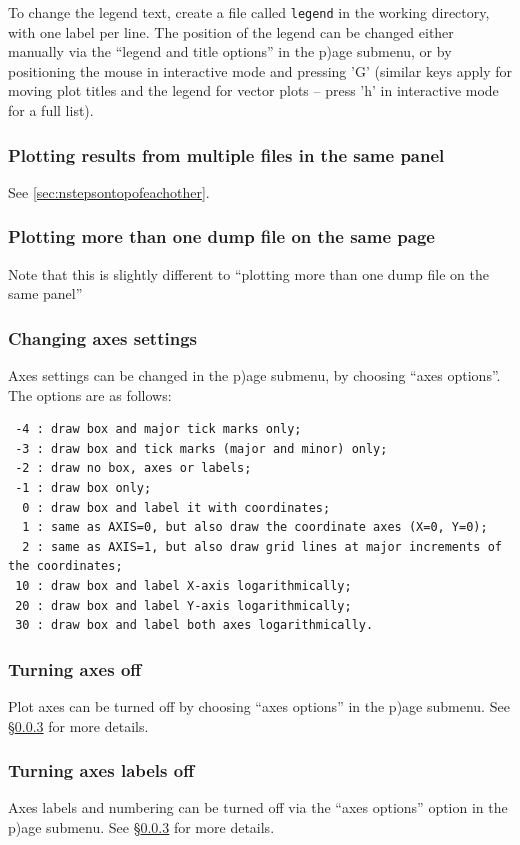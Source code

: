 \documentclass[a4paper,10pt]{article}
\begin{document}
To change the legend text, create a file called \verb+legend+ in the working directory, with one label per line. The position of the legend can be changed either manually via the ``legend and title options'' in the p)age submenu, or by positioning the mouse in interactive mode and pressing 'G' (similar keys apply for moving plot titles and the legend for vector plots -- press 'h' in interactive mode for a full list). 

\subsubsection{ Plotting results from multiple files in the same panel}
 See \ref{sec:nstepsontopofeachother}.

\subsubsection{ Plotting more than one dump file on the same page}
 Note that this is slightly different to ``plotting more than one dump file on the same panel''

\subsubsection{ Changing axes settings}
\label{sec:axessettings}
 Axes settings can be changed in the p)age submenu, by choosing ``axes options''. The options are as follows:
\begin{verbatim}
 -4 : draw box and major tick marks only;
 -3 : draw box and tick marks (major and minor) only;
 -2 : draw no box, axes or labels;
 -1 : draw box only;
  0 : draw box and label it with coordinates;
  1 : same as AXIS=0, but also draw the coordinate axes (X=0, Y=0);
  2 : same as AXIS=1, but also draw grid lines at major increments of the coordinates;
 10 : draw box and label X-axis logarithmically;
 20 : draw box and label Y-axis logarithmically;
 30 : draw box and label both axes logarithmically.
\end{verbatim}

\subsubsection{ Turning axes off}
 Plot axes can be turned off by choosing ``axes options'' in the p)age submenu. See \S\ref{sec:axessettings} for more details. 

\subsubsection{ Turning axes labels off}
 Axes labels and numbering can be turned off via the ``axes options'' option in the p)age submenu. See \S\ref{sec:axessettings} for more details. 
\end{document}
